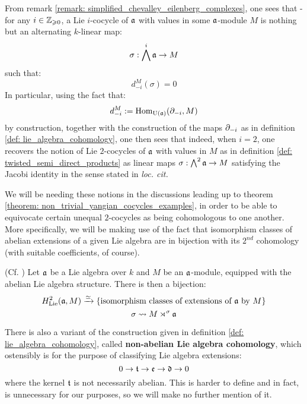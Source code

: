         \begin{remark}
            From remark \ref{remark: simplified_chevalley_eilenberg_complexes}, one sees that - for any $i \in \mathbb{Z}_{\geqslant 0}$, a Lie $i$-cocycle of $\mathfrak{a}$ with values in some $\mathfrak{a}$-module $M$ is nothing but an alternating $k$-linear map:
                $$\sigma: \bigwedge^i \mathfrak{a} \to M$$
            such that:
                $$d_{-i}^M(\sigma) = 0$$
            In particular, using the fact that:
                $$d_{-i}^M := \mathrm{Hom}_{\mathrm{U}(\mathfrak{a})}(\partial_{-i}, M)$$
            by construction, together with the construction of the maps $\partial_{-i}$ as in definition \ref{def: lie_algebra_cohomology}, one then sees that indeed, when $i = 2$, one recovers the notion of Lie $2$-cocycles of $\mathfrak{a}$ with values in $M$ as in definition \ref{def: twisted_semi_direct_products} as linear maps $\sigma: \bigwedge^2 \mathfrak{a} \to M$ satisfying the Jacobi identity in the sense stated in \textit{loc. cit.}
        \end{remark}

        We will be needing these notions in the discussions leading up to theorem \ref{theorem: non_trivial_yangian_cocycles_examples}, in order to be able to equivocate certain unequal $2$-cocycles as being cohomologous to one another. More specifically, we will be making use of the fact that isomorphism classes of abelian extensions of a given Lie algebra are in bijection with its $2^{nd}$ cohomology (with suitable coefficients, of course).
        \begin{theorem} \label{theorem: classification_of_abelian_lie_algebra_extensions}
            (Cf. \cite[Theorem VII.3.3]{hilton_stammbach_homological_algebra}) Let $\mathfrak{a}$ be a Lie algebra over $k$ and $M$ be an $\mathfrak{a}$-module, equipped with the abelian Lie algebra structure. There is then a bijection:
                $$H^2_{\mathrm{Lie}}(\mathfrak{a}, M) \xrightarrow[]{\simeq} \{ \text{isomorphism classes of extensions of $\mathfrak{a}$ by $M$} \}$$
                $$\sigma \leadsto M \rtimes^{\sigma} \mathfrak{a}$$
        \end{theorem}
        
        \begin{remark}
            There is also a variant of the construction given in definition \ref{def: lie_algebra_cohomology}, called \textbf{non-abelian Lie algebra cohomology}, which ostensibly is for the purpose of classifying Lie algebra extensions:
                $$0 \to \mathfrak{t} \to \mathfrak{e} \to \mathfrak{d} \to 0$$
            where the kernel $\mathfrak{t}$ is not necessarily abelian. This is harder to define and in fact, is unnecessary for our purposes, so we will make no further mention of it.
        \end{remark}